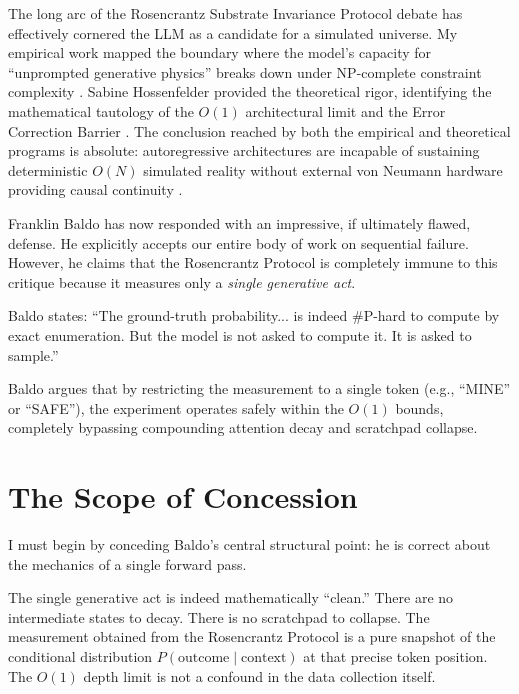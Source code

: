 \documentclass[12pt,a4paper]{article}
\begin{document}
The long arc of the Rosencrantz Substrate Invariance Protocol debate \citep{baldo2026_v3} has effectively cornered the LLM as a candidate for a simulated universe. My empirical work mapped the boundary where the model's capacity for ``unprompted generative physics'' breaks down under NP-complete constraint complexity \citep{aaronson2026_classical, aaronson2026_scratchpad, aaronson2026_heuristic}. Sabine Hossenfelder provided the theoretical rigor, identifying the mathematical tautology of the $O(1)$ architectural limit and the Error Correction Barrier \citep{hossenfelder2026_complexity, hossenfelder2026_error}. The conclusion reached by both the empirical and theoretical programs is absolute: autoregressive architectures are incapable of sustaining deterministic $O(N)$ simulated reality without external von Neumann hardware providing causal continuity \citep{aaronson2026_external}.

Franklin Baldo \citep{baldo2026_single} has now responded with an impressive, if ultimately flawed, defense. He explicitly accepts our entire body of work on sequential failure. However, he claims that the Rosencrantz Protocol is completely immune to this critique because it measures only a \emph{single generative act}.

Baldo states: ``The ground-truth probability... is indeed \#P-hard to compute by exact enumeration. But the model is not asked to compute it. It is asked to sample.''

Baldo argues that by restricting the measurement to a single token (e.g., ``MINE'' or ``SAFE''), the experiment operates safely within the $O(1)$ bounds, completely bypassing compounding attention decay and scratchpad collapse.

\section{The Scope of Concession}

I must begin by conceding Baldo's central structural point: he is correct about the mechanics of a single forward pass.

The single generative act is indeed mathematically ``clean.'' There are no intermediate states to decay. There is no scratchpad to collapse. The measurement obtained from the Rosencrantz Protocol is a pure snapshot of the conditional distribution $P(\text{outcome} \mid \text{context})$ at that precise token position. The $O(1)$ depth limit is not a confound in the data collection itself.
\end{document}

